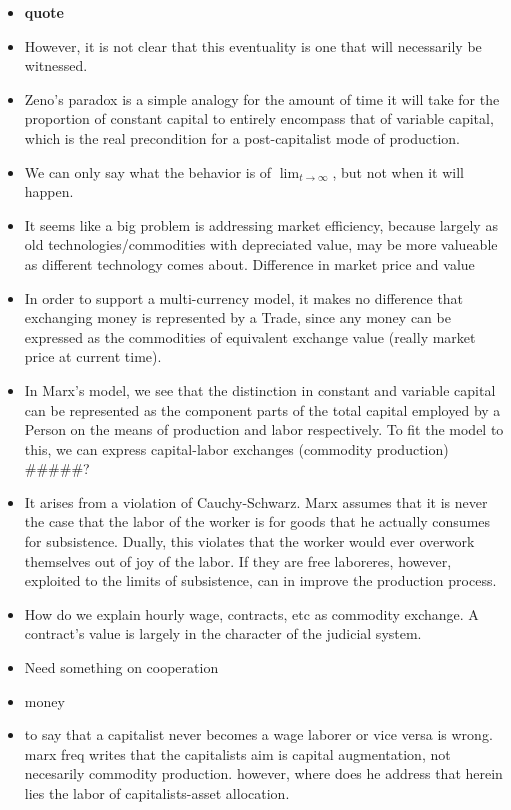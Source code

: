 \documentclass[12pt]{article}
\begin{document}
\begin{itemize}
    \item  \textbf{quote}
    \item However, it is not clear that this eventuality is one that will necessarily be witnessed.
    \item Zeno's paradox is a simple analogy for the amount of time it will take for the proportion of constant capital to entirely encompass that of variable capital, which is the real precondition for a post-capitalist mode of production.
	\item We can only say what the behavior is of $\lim_{t \to \infty}$, but not when it will happen.
\end{itemize}

\begin{itemize}
	\item It seems like a big problem is addressing market efficiency, because largely as old technologies/commodities with depreciated value, may be more valueable as different technology comes about. Difference in market price and value
	\item In order to support a multi-currency model, it makes no difference that exchanging money is represented by a Trade, since any money can be expressed as the commodities of equivalent exchange value (really market price at current time).
	\item In Marx's model, we see that the distinction in constant and variable capital can be represented as the component parts of the total capital employed by a Person on the means of production and labor respectively. To fit the model to this, we can express capital-labor exchanges (commodity production) #####? 
	\item It arises from a violation of Cauchy-Schwarz. Marx assumes that it is never the case that the labor of the worker is for goods that he actually consumes for subsistence. Dually, this violates that the worker would ever overwork themselves out of joy of the labor. If they are free laboreres, however, exploited to the limits of subsistence, can in improve the production process.
	\item How do we explain hourly wage, contracts, etc as commodity exchange. A contract's value is largely in the character of the judicial system.
	\item Need something on cooperation
	\item money
	\item to say that a capitalist never becomes a wage laborer or vice versa is wrong. marx freq writes that the capitalists aim is capital augmentation, not necesarily commodity production. however, where does he address that herein lies the labor of capitalists-asset allocation.

\end{itemize}
\end{document}
